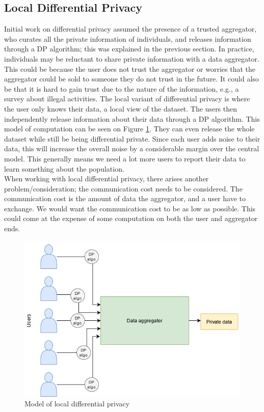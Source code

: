 \documentclass[11pt]{article}
\theoremstyle{definition}
\begin{document}
\subsection{Local Differential Privacy}\label{teo_local}
Initial work on differential privacy assumed the presence of a trusted aggregator, who curates all the private information of individuals, and releases information through a DP algorithm; this was explained in the previous section.  In practice, individuals may be reluctant to share private information with a data aggregator. This could be because the user does not trust the aggregator or worries that the aggregator could be sold to someone they do not trust in the future. It could also be that it is hard to gain trust due to the nature of the information, e.g., a survey about illegal activities. The local variant of differential privacy is where the user only knows their data, a local view of the dataset. The users then independently release information about their data through a DP algorithm. This model of computation can be seen on Figure \ref{fig:model_local_dp}. They can even release the whole dataset while still be being differential private. Since each user adds noise to their data, this will increase the overall noise by a considerable margin over the central model. This generally means we need a lot more users to report their data to learn something about the population. \\

When working with local differential privacy, there arises another problem/consideration; the communication cost needs to be considered. The communication cost is the amount of data the aggregator, and a user have to exchange. We would want the communication cost to be as low as possible. This could come at the expense of some computation on both the user and aggregator ends.
\begin{figure}[H]
    \centering
    \includegraphics[width = .8\textwidth]{figures/DP_local.png}
    \caption{Model of local differential privacy}
    \label{fig:model_local_dp}
\end{figure}
\end{document}
